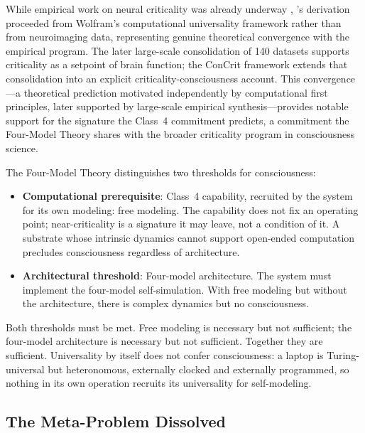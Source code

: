\documentclass[12pt]{article}
\begin{document}
While empirical work on neural criticality was already underway \citep{Beggs2003,Tagliazucchi2012}, \citeauthor{Gruber2015}'s \citeyearpar{Gruber2015} derivation proceeded from Wolfram's computational universality framework rather than from neuroimaging data, representing genuine theoretical convergence with the empirical program. The later large-scale consolidation of 140 datasets \citep{HengenShew2025} supports criticality as a setpoint of brain function; the ConCrit framework \citep{AlgomShriki2026} extends that consolidation into an explicit criticality-consciousness account. This convergence---\hspace{0pt}a theoretical prediction motivated independently by computational first principles, later supported by large-scale empirical synthesis---\hspace{0pt}provides notable support for the signature the Class~4 commitment predicts, a commitment the Four-Model Theory shares with the broader criticality program in consciousness science.

The Four-Model Theory distinguishes two thresholds for consciousness:
\begin{itemize}
\item \textbf{Computational prerequisite}: Class~4 capability, recruited by the system for its own modeling: free modeling. The capability does not fix an operating point; near-criticality is a signature it may leave, not a condition of it. A substrate whose intrinsic dynamics cannot support open-ended computation precludes consciousness regardless of architecture.
\item \textbf{Architectural threshold}: Four-model architecture. The system must implement the four-model self-simulation. With free modeling but without the architecture, there is complex dynamics but no consciousness.
\end{itemize}

Both thresholds must be met. Free modeling is necessary but not sufficient; the four-model architecture is necessary but not sufficient. Together they are sufficient. Universality by itself does not confer consciousness: a laptop is Turing-universal but heteronomous, externally clocked and externally programmed, so nothing in its own operation recruits its universality for self-modeling.


\subsection{The Meta-Problem Dissolved}
\end{document}
